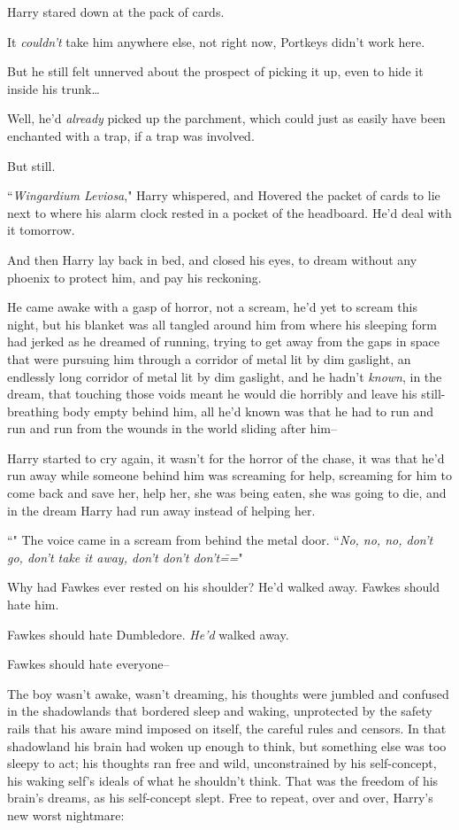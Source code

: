 Harry stared down at the pack of cards.

It \emph{couldn't} take him anywhere else, not right now, Portkeys didn't work here.

But he still felt unnerved about the prospect of picking it up, even to hide it inside his trunk{\ldots}

Well, he'd \emph{already} picked up the parchment, which could just as easily have been enchanted with a trap, if a trap was involved.

But still.

``\emph{Wingardium Leviosa}," Harry whispered, and Hovered the packet of cards to lie next to where his alarm clock rested in a pocket of the headboard. He'd deal with it tomorrow.

And then Harry lay back in bed, and closed his eyes, to dream without any phoenix to protect him, and pay his reckoning.

\later

He came awake with a gasp of horror, not a scream, he'd yet to scream this night, but his blanket was all tangled around him from where his sleeping form had jerked as he dreamed of running, trying to get away from the gaps in space that were pursuing him through a corridor of metal lit by dim gaslight, an endlessly long corridor of metal lit by dim gaslight, and he hadn't \emph{known}, in the dream, that touching those voids meant he would die horribly and leave his still-breathing body empty behind him, all he'd known was that he had to run and run and run from the wounds in the world sliding after him\---

Harry started to cry again, it wasn't for the horror of the chase, it was that he'd run away while someone behind him was screaming for help, screaming for him to come back and save her, help her, she was being eaten, she was going to die, and in the dream Harry had run away instead of helping her.

``" The voice came in a scream from behind the metal door. ``\emph{No, no, no, don't go, don't take it away, don't don't don't\===}"

Why had Fawkes ever rested on his shoulder? He'd walked away. Fawkes should hate him.

Fawkes should hate Dumbledore. \emph{He'd} walked away.

Fawkes should hate everyone\---

The boy wasn't awake, wasn't dreaming, his thoughts were jumbled and confused in the shadowlands that bordered sleep and waking, unprotected by the safety rails that his aware mind imposed on itself, the careful rules and censors. In that shadowland his brain had woken up enough to think, but something else was too sleepy to act; his thoughts ran free and wild, unconstrained by his self-concept, his waking self's ideals of what he shouldn't think. That was the freedom of his brain's dreams, as his self-concept slept. Free to repeat, over and over, Harry's new worst nightmare:

